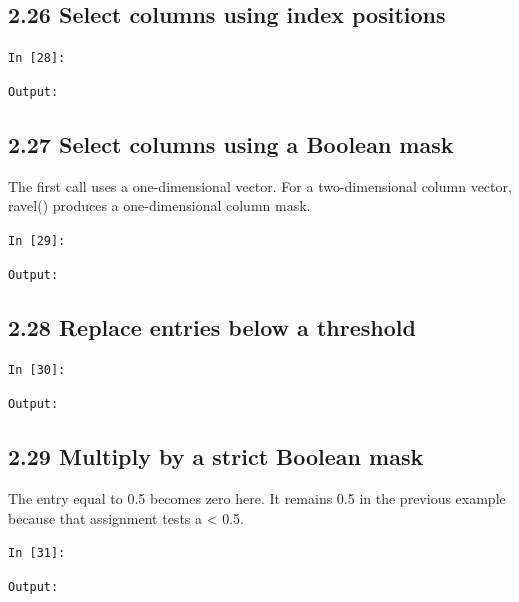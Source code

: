\documentclass[11pt]{article}
\begin{document}
\par\medskip\noindent\begin{minipage}{\linewidth}
\subsection*{2.26 Select columns using index positions}
\noindent\texttt{In [28]:}

\noindent\texttt{Output:}

\end{minipage}\par

\par\medskip\noindent\begin{minipage}{\linewidth}
\subsection*{2.27 Select columns using a Boolean mask}
The first call uses a one-dimensional vector. For a two-dimensional column vector, ravel() produces a one-dimensional column mask.

\noindent\texttt{In [29]:}

\noindent\texttt{Output:}

\end{minipage}\par

\par\medskip\noindent\begin{minipage}{\linewidth}
\subsection*{2.28 Replace entries below a threshold}
\noindent\texttt{In [30]:}

\noindent\texttt{Output:}

\end{minipage}\par

\par\medskip\noindent\begin{minipage}{\linewidth}
\subsection*{2.29 Multiply by a strict Boolean mask}
The entry equal to 0.5 becomes zero here. It remains 0.5 in the previous example because that assignment tests a < 0.5.

\noindent\texttt{In [31]:}

\noindent\texttt{Output:}

\end{minipage}\par
\end{document}
